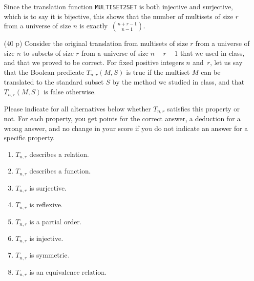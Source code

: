 \documentclass{jn-pset}
\begin{document}
\begin{problem}
\begin{solution}
  Since the translation function
  \verb+MULTISET2SET+
  is both injective and surjective, which is to say it is bijective,
  this shows that the number of multisets of size $r$ from
  a universe of size $n$ is exactly~$\binom{n + r - 1}{n-1}$.  
\end{solution}


  \begin{subproblem}%
    \label{problem:multiset-3}%
    {(40 p)}
    {\ignorespaces}
    Consider the original translation from multisets of size $r$ from a
    universe of size $n$ to subsets of size $r$ from a universe of
    size
    $n + r - 1$ that we used in class, and that we proved to be correct.
    For fixed positive integers $n$ and~$r$, let us say that the Boolean predicate
    $T_{n,r}(M,S)$
    is true if the multiset $M$ can be translated to the standard
    subset $S$ by the method we studied in class, and that
    $T_{n,r}(M,S)$
    is false otherwise.
    
    Please indicate
    for all alternatives below whether $T_{n,r}$ satisfies this property or
    not. For each property, you get points for the correct
    answer,
    a deduction for
    a wrong answer, and no change in your score if you do not
    indicate an answer for a specific property.
    \begin{enumerate}  %
    \item
      $T_{n,r}$ describes a relation.
      
    \item
      $T_{n,r}$ describes a function.
      
    \item
      $T_{n,r}$ is surjective.
      
    \item
      $T_{n,r}$ is reflexive.
  
    \item
      $T_{n,r}$ is a partial order.
      
    \item
      $T_{n,r}$ is injective.
      
    \item
      $T_{n,r}$ is symmetric.
      
    \item
      $T_{n,r}$ is an equivalence relation.
      
    \end{enumerate}
    

\end{subproblem}
\end{problem}
\end{document}
